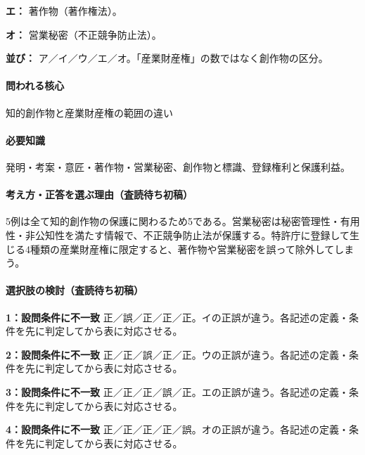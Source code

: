 \noindent\textbf{エ：} 著作物（著作権法）。\par

\noindent\textbf{オ：} 営業秘密（不正競争防止法）。\par

\noindent\textbf{並び：} ア／イ／ウ／エ／オ。「産業財産権」の数ではなく創作物の区分。\par

\paragraph{問われる核心} 知的創作物と産業財産権の範囲の違い

\paragraph{必要知識} 発明・考案・意匠・著作物・営業秘密、創作物と標識、登録権利と保護利益。

\paragraph{考え方・正答を選ぶ理由（査読待ち初稿）} 5例は全て知的創作物の保護に関わるため5である。営業秘密は秘密管理性・有用性・非公知性を満たす情報で、不正競争防止法が保護する。特許庁に登録して生じる4種類の産業財産権に限定すると、著作物や営業秘密を誤って除外してしまう。

\paragraph{選択肢の検討（査読待ち初稿）}\mbox{}\par

\noindent\textbf{1：設問条件に不一致} 正／誤／正／正／正。イの正誤が違う。各記述の定義・条件を先に判定してから表に対応させる。\par

\noindent\textbf{2：設問条件に不一致} 正／正／誤／正／正。ウの正誤が違う。各記述の定義・条件を先に判定してから表に対応させる。\par

\noindent\textbf{3：設問条件に不一致} 正／正／正／誤／正。エの正誤が違う。各記述の定義・条件を先に判定してから表に対応させる。\par

\noindent\textbf{4：設問条件に不一致} 正／正／正／正／誤。オの正誤が違う。各記述の定義・条件を先に判定してから表に対応させる。\par


